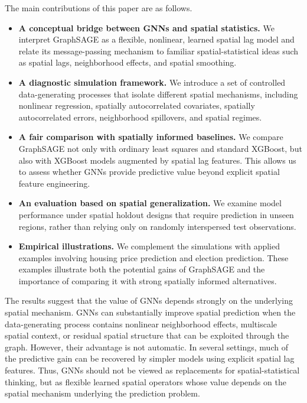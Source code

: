 \documentclass[ASNA, twocolumn]{USG} %
\begin{document}
The main contributions of this paper are as follows.

\begin{itemize}

\item \textbf{A conceptual bridge between GNNs and spatial statistics.}
We interpret GraphSAGE as a flexible, nonlinear, learned spatial lag model and relate its message-passing mechanism to familiar spatial-statistical ideas such as spatial lags, neighborhood effects, and spatial smoothing.

\item \textbf{A diagnostic simulation framework.}
We introduce a set of controlled data-generating processes that isolate different spatial mechanisms, including nonlinear regression, spatially autocorrelated covariates, spatially autocorrelated errors, neighborhood spillovers, and spatial regimes.

\item \textbf{A fair comparison with spatially informed baselines.}
We compare GraphSAGE not only with ordinary least squares and standard XGBoost, but also with XGBoost models augmented by spatial lag features. This allows us to assess whether GNNs provide predictive value beyond explicit spatial feature engineering.

\item \textbf{An evaluation based on spatial generalization.}
We examine model performance under spatial holdout designs that require prediction in unseen regions, rather than relying only on randomly interspersed test observations.

\item \textbf{Empirical illustrations.}
We complement the simulations with applied examples involving housing price prediction and election prediction. These examples illustrate both the potential gains of GraphSAGE and the importance of comparing it with strong spatially informed alternatives.

\end{itemize}

The results suggest that the value of GNNs depends strongly on the underlying spatial mechanism. GNNs can substantially improve spatial prediction when the data-generating process contains nonlinear neighborhood effects, multiscale spatial context, or residual spatial structure that can be exploited through the graph. However, their advantage is not automatic. In several settings, much of the predictive gain can be recovered by simpler models using explicit spatial lag features. Thus, GNNs should not be viewed as replacements for spatial-statistical thinking, but as flexible learned spatial operators whose value depends on the spatial mechanism underlying the prediction problem.
\end{document}
